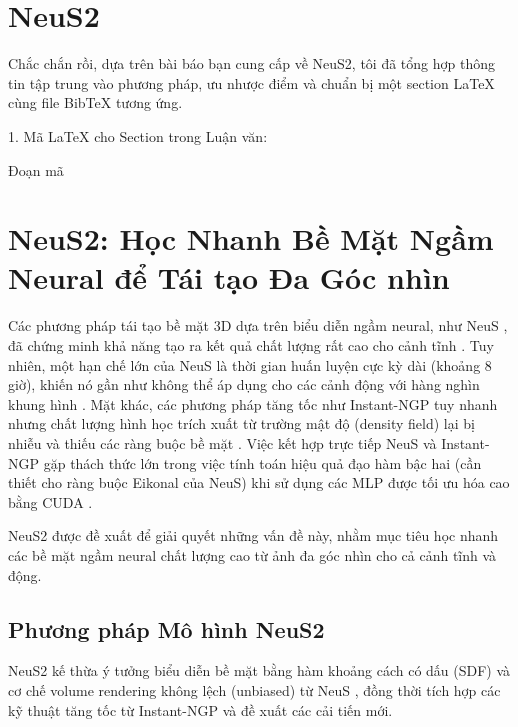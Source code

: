 \section{NeuS2}
Chắc chắn rồi, dựa trên bài báo bạn cung cấp về NeuS2, tôi đã tổng hợp thông tin tập trung vào phương pháp, ưu nhược điểm và chuẩn bị một section LaTeX cùng file BibTeX tương ứng.

1. Mã LaTeX cho Section trong Luận văn:

Đoạn mã

\section{NeuS2: Học Nhanh Bề Mặt Ngầm Neural để Tái tạo Đa Góc nhìn}

Các phương pháp tái tạo bề mặt 3D dựa trên biểu diễn ngầm neural, như NeuS \cite{Wang2021NeuS}, đã chứng minh khả năng tạo ra kết quả chất lượng rất cao cho cảnh tĩnh \cite{Wang2023NeuS2_source_1}. Tuy nhiên, một hạn chế lớn của NeuS là thời gian huấn luyện cực kỳ dài (khoảng 8 giờ), khiến nó gần như không thể áp dụng cho các cảnh động với hàng nghìn khung hình \cite{Wang2023NeuS2_source_2, Wang2023NeuS2_source_17}. Mặt khác, các phương pháp tăng tốc như Instant-NGP \cite{Muller2022InstantNGP} tuy nhanh nhưng chất lượng hình học trích xuất từ trường mật độ (density field) lại bị nhiễu và thiếu các ràng buộc bề mặt \cite{Wang2023NeuS2_source_19, Wang2023NeuS2_source_94}. Việc kết hợp trực tiếp NeuS và Instant-NGP gặp thách thức lớn trong việc tính toán hiệu quả đạo hàm bậc hai (cần thiết cho ràng buộc Eikonal của NeuS) khi sử dụng các MLP được tối ưu hóa cao bằng CUDA \cite{Wang2023NeuS2_source_23, Wang2023NeuS2_source_24, Wang2023NeuS2_source_95, Wang2023NeuS2_source_96, Wang2023NeuS2_source_97, Wang2023NeuS2_source_98}.

NeuS2 \cite{Wang2023NeuS2} được đề xuất để giải quyết những vấn đề này, nhằm mục tiêu học nhanh các bề mặt ngầm neural chất lượng cao từ ảnh đa góc nhìn cho cả cảnh tĩnh và động.

\subsection{Phương pháp Mô hình NeuS2}

NeuS2 kế thừa ý tưởng biểu diễn bề mặt bằng hàm khoảng cách có dấu (SDF) và cơ chế volume rendering không lệch (unbiased) từ NeuS \cite{Wang2021NeuS}, đồng thời tích hợp các kỹ thuật tăng tốc từ Instant-NGP \cite{Muller2022InstantNGP} và đề xuất các cải tiến mới.

